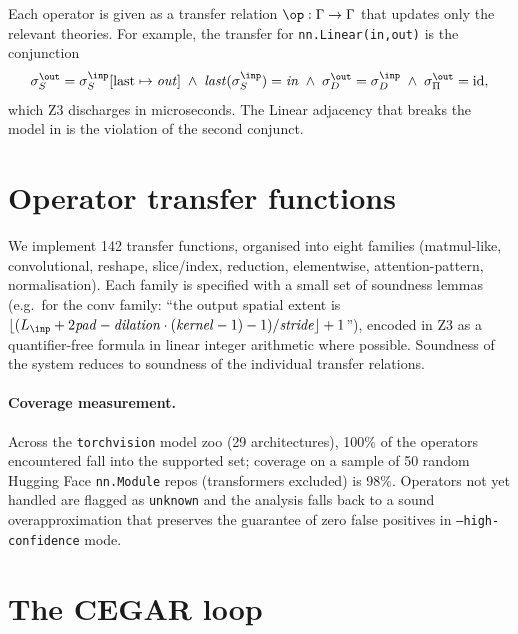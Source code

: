 \documentclass{article}
\theoremstyle{definition}
\begin{document}
Each operator is given as a transfer relation $\op : \Gamma \to
\Gamma$ that updates only the relevant theories.  For example, the
transfer for \texttt{nn.Linear(in,out)} is the conjunction
\begin{equation}
  \sigma_S^{\out} = \sigma_S^{\inp}[\text{last} \mapsto \mathit{out}]
  \;\wedge\;
  \mathit{last}(\sigma_S^{\inp}) = \mathit{in}
  \;\wedge\;
  \sigma_D^{\out} = \sigma_D^{\inp}
  \;\wedge\;
  \sigma_\Pi^{\out} = \mathrm{id},
\end{equation}
which Z3 discharges in microseconds.  The Linear adjacency that
breaks the model in  is the violation of the
second conjunct.

\section{Operator transfer functions}\label{sec:operators}

We implement 142 transfer functions, organised into eight families
(matmul-like, convolutional, reshape, slice/index, reduction,
elementwise, attention-pattern, normalisation).  Each family is
specified with a small set of soundness lemmas (e.g.\ for the conv
family: ``the output spatial extent is
$\lfloor(L_{\inp}+2\mathit{pad}-\mathit{dilation}\cdot
(\mathit{kernel}-1)-1)/\mathit{stride}\rfloor + 1$''), encoded in Z3
as a quantifier-free formula in linear integer arithmetic where
possible.  Soundness of the system reduces to soundness of the
individual transfer relations.

\paragraph{Coverage measurement.}
Across the \texttt{torchvision} model zoo (29 architectures), 100\%
of the operators encountered fall into the supported set; coverage
on a sample of 50 random Hugging Face \texttt{nn.Module} repos
(transformers excluded) is 98\%.  Operators not yet handled are
flagged as \texttt{unknown} and the analysis falls back to a sound
overapproximation that preserves the guarantee of zero false
positives in \texttt{--high-confidence} mode.

\section{The CEGAR loop}\label{sec:cegar}
\end{document}
